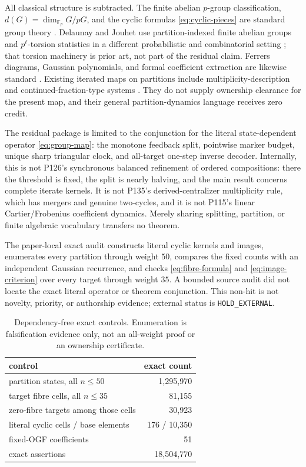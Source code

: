 \documentclass[10pt,a4paper]{amsart}
\theoremstyle{definition}
\theoremstyle{remark}
\begin{document}
All classical structure is subtracted.  The finite abelian $p$-group
classification, $d(G)=\dim_{\mathbb F_p}G/pG$, and the cyclic formulas
\eqref{eq:cyclic-pieces} are standard group theory \cite{Fuchs2015}.
Delaunay and Jouhet use partition-indexed finite abelian groups and
$p^\ell$-torsion statistics in a different probabilistic and combinatorial
setting \cite{DelaunayJouhet2014}; that torsion machinery is prior art, not
part of the residual claim.  Ferrers diagrams, Gaussian polynomials, and
formal coefficient extraction are likewise standard \cite{Andrews1984}.
Existing iterated maps on partitions include multiplicity-description and
continued-fraction-type systems \cite{EliahouErickson2013,BaalbakiEtAl2024}.
They do not supply ownership clearance for the present map, and their general
partition-dynamics language receives zero credit.

The residual package is limited to the conjunction for the literal
state-dependent operator \eqref{eq:group-map}: the monotone feedback split,
pointwise marker budget, unique sharp triangular clock, and all-target
one-step inverse decoder.  Internally, this is not P126's synchronous
balanced refinement of ordered compositions: there the threshold is fixed,
the split is nearly halving, and the main result concerns complete iterate
kernels.  It is not P135's derived-centralizer multiplicity rule, which has
mergers and genuine two-cycles, and it is not P115's linear Cartier/Frobenius
coefficient dynamics.  Merely sharing splitting, partition, or finite
algebraic vocabulary transfers no theorem.

The paper-local exact audit constructs literal cyclic kernels and images,
enumerates every partition through weight $50$, compares the fixed counts
with an independent Gaussian recurrence, and checks \eqref{eq:fibre-formula}
and \eqref{eq:image-criterion} over every target through weight $35$.  A
bounded source audit did not locate the exact literal operator or theorem
conjunction.  This non-hit is not novelty, priority, or authorship evidence;
external status is \texttt{HOLD\_EXTERNAL}.

\begin{table}[!htbp]
\centering
\small
\begin{tabular}{@{}lr@{}}
\toprule
control & exact count \\
\midrule
partition states, all $n\leq50$ & 1,295,970 \\
target fibre cells, all $n\leq35$ & 81,155 \\
zero-fibre targets among those cells & 30,923 \\
literal cyclic cells / base elements & 176 / 10,350 \\
fixed-OGF coefficients & 51 \\
exact assertions & 18,504,770 \\
\bottomrule
\end{tabular}
\caption{Dependency-free exact controls.  Enumeration is falsification
evidence only, not an all-weight proof or an ownership certificate.}
\label{tab:controls}
\end{table}



\end{document}
